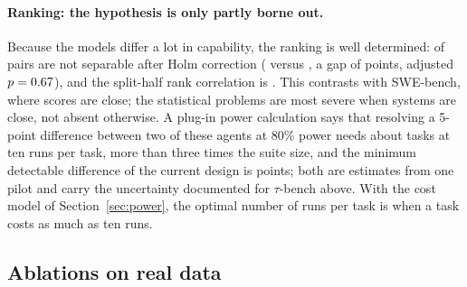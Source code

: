 \paragraph{Ranking: the hypothesis is only partly borne out.} Because the models differ a lot in capability, the ranking is well determined: \realNIndist{} of \realNPairs{} pairs are not separable after Holm correction (\realClosestA{} versus \realClosestB{}, a gap of \realClosestDiff{} points, adjusted $p=0.67$), and the split-half rank correlation is \realSplitTau. This contrasts with SWE-bench, where scores are close; the statistical problems are most severe when systems are close, not absent otherwise. A plug-in power calculation says that resolving a 5-point difference between two of these agents at 80\% power needs about \realTasksNeeded{} tasks at ten runs per task, more than three times the suite size, and the minimum detectable difference of the current design is \realMDE{} points; both are estimates from one pilot and carry the uncertainty documented for $\tau$-bench above. With the cost model of Section~\ref{sec:power}, the optimal number of runs per task is \realOptRuns{} when a task costs as much as ten runs.

\subsection{Ablations on real data}\label{sec:ablation}
